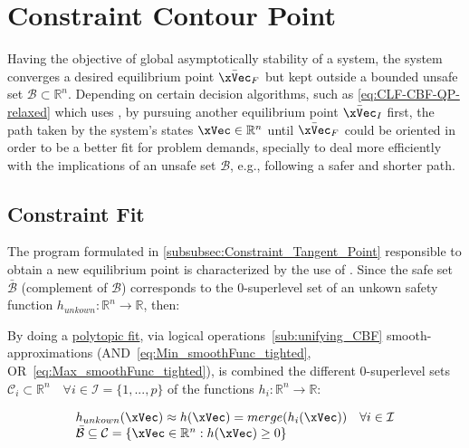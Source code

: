 \newpage %


\section{Constraint Contour Point}
\label{sec:Constraint_Contour_Point}

Having the objective of global asymptotically  stability of a system, the system converges a desired equilibrium point \(\bar{\xVec}_F\) but kept outside a bounded unsafe set \(\mathcal{B} \subset \mathbb{R}^n\). Depending on certain decision algorithms, such as \eqref{eq:CLF-CBF-QP-relaxed} which uses , by pursuing another equilibrium point \(\bar{\xVec}_I\) first, the path taken by the system's states \(\xVec \in \mathbb{R}^n\) until \(\bar{\xVec}_F\) could be oriented in order to be a better fit for problem demands, specially to deal more efficiently with the implications of an unsafe set \(\mathcal{B}\), e.g., following a safer and shorter path.\\

\subsection{Constraint Fit}
\label{subsec:Constraint_Fit}

The program formulated in \ref{subsubsec:Constraint_Tangent_Point} responsible to obtain a new equilibrium point is characterized by the use of . Since the safe set \(\bar{\mathcal{B}}\) (complement of \(\mathcal{B}\)) corresponds to the 0-superlevel set of an unkown safety function \(h_{unkown}: \mathbb{R}^n \to \mathbb{R}\), then:

By doing a \underline{polytopic fit}, via logical operations~\ref{sub:unifying_CBF} smooth-approximations (AND~\eqref{eq:Min_smoothFunc_tighted}, OR~\eqref{eq:Max_smoothFunc_tighted}), is combined the different 0-superlevel sets \(\mathcal{C}_i \subset \mathbb{R}^n \quad \forall i \in \mathcal{I} = \{1,...,p\}\) of the functions \(h_i: \mathbb{R}^n \to \mathbb{R}\):

\begin{equation}
    \begin{array}{l}
        h_{unkown}(\xVec) \approx h(\xVec) = merge(h_i(\xVec)) \quad \forall i \in \mathcal{I} \\
        \bar{\mathcal{B}} \subseteq \mathcal{C} = \{\xVec \in \mathbb{R}^n: h(\xVec) \geq 0\}
    \end{array}
    \label{eq:Polytope_fit}
\end{equation}

